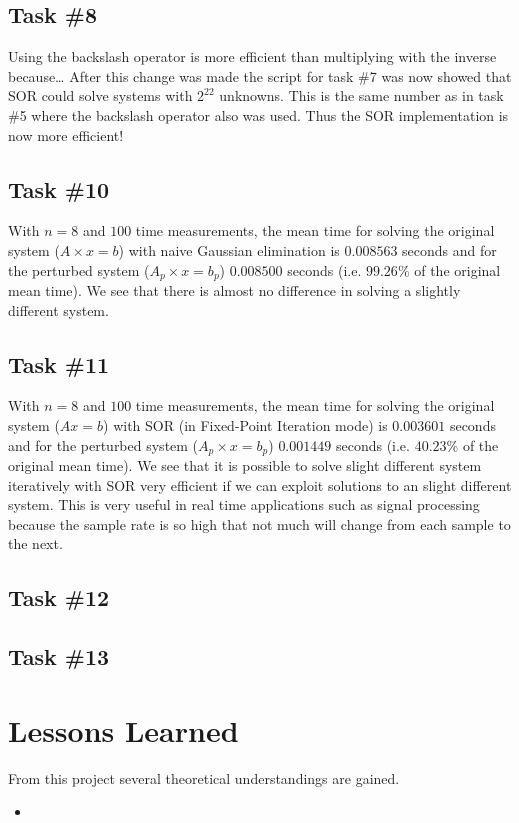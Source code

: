 \documentclass[10pt, a4paper]{article}
\begin{document}
\subsection{Task \#8}
Using the backslash operator is more efficient than multiplying with the inverse because\ldots %
After this change was made the script for task \#7 was now showed that SOR could solve systems with $2^{22}$ unknowns. This is the same number as in task \#5 where the backslash operator also was used. Thus the SOR implementation is now more efficient! %

\subsection{Task \#10}
With $n=8$ and $100$ time measurements, the mean time for solving the original system ($A\times x=b$) with naive Gaussian elimination is $0.008563$ seconds  and for the perturbed system ($A_p\times x=b_p$) $0.008500$ seconds (i.e. $99.26\%$ of the original mean time). We see that there is almost no difference in solving a slightly different system.

\subsection{Task \#11}
With $n=8$ and $100$ time measurements, the mean time for solving the original system ($Ax=b$) with SOR (in Fixed-Point Iteration mode) is $0.003601$ seconds and for the perturbed system ($A_p\times x=b_p$) $0.001449$ seconds (i.e. $40.23\%$ of the original mean time). We see that it is possible to solve slight different system iteratively with SOR very efficient if we can exploit solutions to an slight different system. This is very useful in real time applications such as signal processing because the sample rate is so high that not much will change from each sample to the next.

\subsection{Task \#12}

\subsection{Task \#13}



\section{Lessons Learned}
From this project several theoretical understandings are gained.
\begin{itemize}
	\item  %
\end{itemize}
\end{document}
